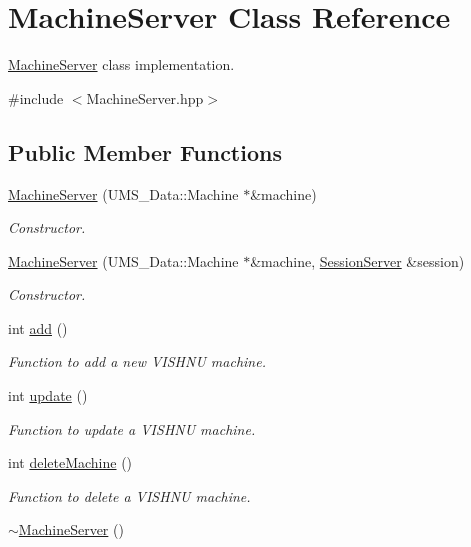 \hypertarget{classMachineServer}{
\section{MachineServer Class Reference}
\label{classMachineServer}
}


\hyperlink{classMachineServer}{MachineServer} class implementation.  




{\ttfamily \#include $<$MachineServer.hpp$>$}

\subsection*{Public Member Functions}
\begin{DoxyCompactItemize}
\item 
\hyperlink{classMachineServer_a067dab7512c1882721579dea892a5f8c}{MachineServer} (UMS\_\-Data::Machine $\ast$\&machine)
\begin{DoxyCompactList}\small\item\em Constructor. \item\end{DoxyCompactList}\item 
\hyperlink{classMachineServer_ac65f4c23f95852a0725a0561b276f383}{MachineServer} (UMS\_\-Data::Machine $\ast$\&machine, \hyperlink{classSessionServer}{SessionServer} \&session)
\begin{DoxyCompactList}\small\item\em Constructor. \item\end{DoxyCompactList}\item 
int \hyperlink{classMachineServer_ad70b95ea991526066056bf81c016c8fc}{add} ()
\begin{DoxyCompactList}\small\item\em Function to add a new VISHNU machine. \item\end{DoxyCompactList}\item 
int \hyperlink{classMachineServer_a06dcfd04b484d41b54554978c45b73c8}{update} ()
\begin{DoxyCompactList}\small\item\em Function to update a VISHNU machine. \item\end{DoxyCompactList}\item 
int \hyperlink{classMachineServer_a0efa7bde46c67e38e973705363c3d8a1}{deleteMachine} ()
\begin{DoxyCompactList}\small\item\em Function to delete a VISHNU machine. \item\end{DoxyCompactList}\item 
\hypertarget{classMachineServer_a03bf79f9afe40bcc63212b03b0eef81a}{
\hyperlink{classMachineServer_a03bf79f9afe40bcc63212b03b0eef81a}{$\sim$MachineServer} ()}
\label{classMachineServer_a03bf79f9afe40bcc63212b03b0eef81a}


\end{DoxyCompactItemize}
